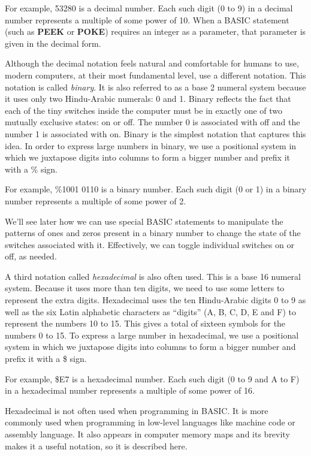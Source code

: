 For example, 53280 is a decimal number. Each such digit (0 to 9) in a decimal number represents a multiple of some power of 10. When a BASIC statement (such as {\bf PEEK} or {\bf POKE}) requires an integer as a parameter, that parameter is given in the decimal form.

Although the decimal notation feels natural and comfortable for humans to use, modern computers, at their most fundamental level, use a different notation. This notation is called {\it binary}. It is also referred to as a base 2 numeral system because it uses only two Hindu-Arabic numerals: 0 and 1. Binary reflects the fact that each of the tiny switches inside the computer must be in exactly one of two mutually exclusive states: on or off. The number 0 is associated with off and the number 1 is associated with on. Binary is the simplest notation that captures this idea. In order to express large numbers in binary, we use a positional system in which we juxtapose digits into columns to form a bigger number and prefix it with a \% sign.

For example, \%1001 0110 is a binary number. Each such digit (0 or 1) in a binary number represents a multiple of some power of 2.

We’ll see later how we can use special BASIC statements to manipulate the patterns of ones and zeros present in a binary number to change the state of the switches associated with it. Effectively, we can toggle individual switches on or off, as needed.

A third notation called {\it hexadecimal} is also often used. This is a base 16 numeral system. Because it uses more than ten digits, we need to use some letters to represent the extra digits. Hexadecimal uses the ten Hindu-Arabic digits 0 to 9 as well as the six Latin alphabetic characters as ``digits'' (A, B, C, D, E and F) to represent the numbers 10 to 15. This gives a total of sixteen symbols for the numbers 0 to 15. To express a large number in hexadecimal, we use a positional system in which we juxtapose digits into columns to form a bigger number and prefix it with a \$ sign.

For example, \$E7 is a hexadecimal number. Each such digit (0 to 9 and A to F) in a hexadecimal number represents a multiple of some power of 16.

Hexadecimal is not often used when programming in BASIC. It is more commonly used when programming in low-level languages like machine code or assembly language. It also appears in computer memory maps and its brevity makes it a useful notation, so it is described here.

